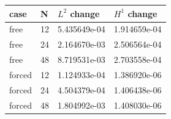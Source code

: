 \begin{center}\small
\begin{tabular}{llll}
\toprule
case & N & $L^2$ change & $H^1$ change\\
\midrule
free & 12 & 5.435649e-04 & 1.914659e-04\\
free & 24 & 2.164670e-03 & 2.506564e-04\\
free & 48 & 8.719531e-03 & 2.703558e-04\\
forced & 12 & 1.124933e-04 & 1.386920e-06\\
forced & 24 & 4.504379e-04 & 1.406438e-06\\
forced & 48 & 1.804992e-03 & 1.408030e-06\\
\bottomrule
\end{tabular}\end{center}
